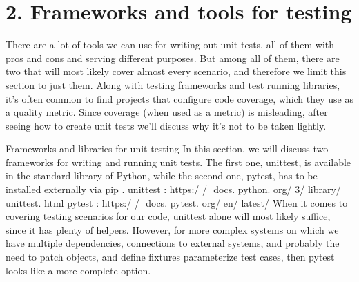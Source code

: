\documentclass[a4paper,10pt,english]{sphinxmanual}
\begin{document}
\section{2. Frameworks and tools for testing}
\label{\detokenize{chapters/8_unit_testing/index:frameworks-and-tools-for-testing}}
There are a lot of tools we can use for writing out unit tests, all of them with pros and cons
and serving different purposes. But among all of them, there are two that will most likely
cover almost every scenario, and therefore we limit this section to just them.
Along with testing frameworks and test running libraries, it’s often common to find projects
that configure code coverage, which they use as a quality metric. Since coverage (when
used as a metric) is misleading, after seeing how to create unit tests we’ll discuss why it’s
not to be taken lightly.

Frameworks and libraries for unit testing
In this section, we will discuss two frameworks for writing and running unit tests. The first
one, unittest, is available in the standard library of Python, while the second
one, pytest, has to be installed externally via pip .
unittest : https:/​ / ​ docs.​ python.​ org/​ 3/​ library/​ unittest.​ html
pytest : https:/​ / ​ docs.​ pytest.​ org/​ en/​ latest/
When it comes to covering testing scenarios for our code, unittest alone will most likely
suffice, since it has plenty of helpers. However, for more complex systems on which we
have multiple dependencies, connections to external systems, and probably the need to
patch objects, and define fixtures parameterize test cases, then pytest looks like a more
complete option.
\end{document}

